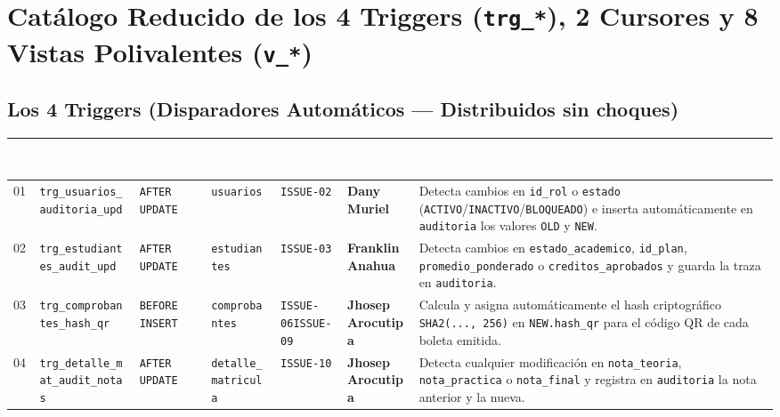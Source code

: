 \documentclass[10pt,a4paper,landscape]{article}
\newcommand{\devDany}{\textbf{\textcolor{unjbgNavy}{Dany Muriel}} \newline {\scriptsize(Lead / QA)}}
\newcommand{\devFranklin}{\textbf{\textcolor{teal!80!black}{Franklin Anahua}} \newline {\scriptsize(Backend / DB)}}
\newcommand{\devJhosep}{\textbf{\textcolor{orange!85!black}{Jhosep Arocutipa}} \newline {\scriptsize(Reportes / UI)}}
\begin{document}
\newpage

\section{Catálogo Reducido de los 4 Triggers (\texttt{trg\_*}), 2 Cursores y 8 Vistas Polivalentes (\texttt{v\_*})}

\subsection{Los 4 Triggers (Disparadores Automáticos — Distribuidos sin choques)}
\footnotesize
\renewcommand{\arraystretch}{1.28}
\begin{longtable}{|p{0.5cm}|p{5.0cm}|p{2.8cm}|p{3.2cm}|p{2.0cm}|p{2.5cm}|p{9.2cm}|}
\hline
\rowcolor{unjbgNavy}
\textcolor{white}{\textbf{N°}} & 
\textcolor{white}{\textbf{Nombre del Trigger}} & 
\textcolor{white}{\textbf{Momento/Evento}} & 
\textcolor{white}{\textbf{Tabla Asociada}} & 
\textcolor{white}{\textbf{Issue Git}} & 
\textcolor{white}{\textbf{Responsable}} & 
\textcolor{white}{\textbf{Qué Hace Exactamente el Trigger}} \\
\hline
\endfirsthead
\hline
\endlastfoot

01 & \texttt{trg\_usuarios\_auditoria\_upd} & \texttt{AFTER UPDATE} & \texttt{usuarios} & \texttt{ISSUE-02} & \devDany & Detecta cambios en \texttt{id\_rol} o \texttt{estado} (\texttt{ACTIVO}/\texttt{INACTIVO}/\texttt{BLOQUEADO}) e inserta automáticamente en \texttt{auditoria} los valores \texttt{OLD} y \texttt{NEW}. \\
\hline
\rowcolor{rowAlt}
02 & \texttt{trg\_estudiantes\_audit\_upd} & \texttt{AFTER UPDATE} & \texttt{estudiantes} & \texttt{ISSUE-03} & \devFranklin & Detecta cambios en \texttt{estado\_academico}, \texttt{id\_plan}, \texttt{promedio\_ponderado} o \texttt{creditos\_aprobados} y guarda la traza en \texttt{auditoria}. \\
\hline
03 & \texttt{trg\_comprobantes\_hash\_qr} & \texttt{BEFORE INSERT} & \texttt{comprobantes} & \texttt{ISSUE-06}\newline \texttt{ISSUE-09} & \devJhosep & Calcula y asigna automáticamente el hash criptográfico \texttt{SHA2(..., 256)} en \texttt{NEW.hash\_qr} para el código QR de cada boleta emitida. \\
\hline
\rowcolor{rowAlt}
04 & \texttt{trg\_detalle\_mat\_audit\_notas} & \texttt{AFTER UPDATE} & \texttt{detalle\_matricula} & \texttt{ISSUE-10} & \devJhosep & Detecta cualquier modificación en \texttt{nota\_teoria}, \texttt{nota\_practica} o \texttt{nota\_final} y registra en \texttt{auditoria} la nota anterior y la nueva. \\
\hline
\end{longtable}
\normalsize
\end{document}
